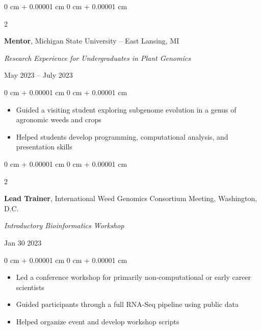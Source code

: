 \documentclass[10pt, letterpaper]{article}
\newenvironment{highlights}{
    \begin{itemize}[
        topsep=0.10 cm,
        parsep=0.10 cm,
        partopsep=0pt,
        itemsep=0pt,
        leftmargin=0 cm + 10pt
    ]
}{
    \end{itemize}
} %
\newenvironment{onecolentry}{
    \begin{adjustwidth}{
        0 cm + 0.00001 cm
    }{
        0 cm + 0.00001 cm
    }
}{
    \end{adjustwidth}
} %
\newenvironment{twocolentry}[2][]{
    \onecolentry
    \def\secondColumn{#2}
    \setcolumnwidth{\fill, 4.5 cm}
    \begin{paracol}{2}
}{
    \switchcolumn \raggedleft \secondColumn
    \end{paracol}
    \endonecolentry
} %
\begin{document}
        
        \vspace{0.2 cm}


        \begin{samepage} 
            \begin{twocolentry}{
                May 2023 – July 2023
                }
                \textbf{Mentor}, Michigan State University -- East Lansing, MI
                
                \vspace{0.05 cm}

                \textit{Research Experience for Undergraduates in Plant Genomics}
            \end{twocolentry}
        \end{samepage}          

        \vspace{0.10 cm}
        
        \begin{onecolentry}
            \begin{highlights}
                \item Guided a visiting student exploring subgenome evolution in a genus of agronomic weeds and crops
                \item Helped students develop programming, computational analysis, and presentation skills
            \end{highlights}
        \end{onecolentry}
        

        \vspace{0.2 cm}


        \begin{samepage} 
            \begin{twocolentry}{
                Jan 30 2023
                }
                \textbf{Lead Trainer}, International Weed Genomics Consortium Meeting, Washington, D.C.
                
                \vspace{0.05 cm}

                \textit{Introductory Bioinformatics Workshop}
            \end{twocolentry}
        \end{samepage}
        
        \begin{onecolentry}
            \begin{highlights}
                \item Led a conference workshop for primarily non-computational or early career scientists
                \item Guided participants through a full RNA-Seq pipeline using public data
                \item Helped organize event and develop workshop scripts               
            \end{highlights}
        \end{onecolentry}
\end{document}
